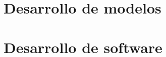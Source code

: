 \documentclass{article}
\begin{document}
\clearpage\hbox{}\thispagestyle{empty}\newpage
\clearpage\hbox{}\thispagestyle{empty}\newpage



\clearpage\hbox{}\thispagestyle{empty}\newpage



\clearpage\hbox{}\thispagestyle{empty}\newpage



\clearpage\hbox{}\thispagestyle{empty}\newpage



\clearpage\hbox{}\thispagestyle{empty}\newpage



\clearpage\hbox{}\thispagestyle{empty}\newpage
\clearpage\hbox{}\thispagestyle{empty}\newpage

\newpage
\tableofcontents

\newpage
\listoffigures

\newpage
\listoftables

\newpage



\newpage


\newpage


\newpage
\part{Desarrollo de modelos}

\newpage


\newpage


\newpage


\newpage
\part{Desarrollo de software}
\newpage


\newpage


\newpage


\appendix

\newpage


\newpage


\newpage

\end{document}
